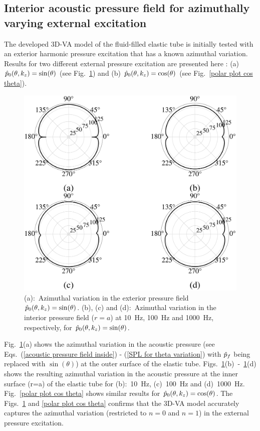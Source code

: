 \documentclass[11pt,cleanfoot]{asme2ej}
\begin{document}
\subsection{Interior acoustic pressure field for azimuthally varying external excitation}
\label{azimuthal excitation}
The developed 3D-VA model of the fluid-filled elastic tube is initially tested with an exterior harmonic pressure excitation that has a known azimuthal variation. Results for two different external pressure excitation are presented here : (a) $\Hat{p}_0(\theta,k_z) = \sin(\theta)$ (see Fig.~\ref{polar plot sin theta}) and (b) $\Hat{p}_0(\theta,k_z) = \cos(\theta)$ (see Fig.~\ref{polar plot cos theta}).


\begin{figure}[ht]
    \centerline{
    \includegraphics[width=4.5in]{polarplot_sin_theta.eps}}
    \caption{(a):~Azimuthal variation in the exterior pressure field $\Hat{p}_0(\theta,k_z) =\sin(\theta)$. (b), (c) and (d):~Azimuthal variation in the interior pressure field ($r=a$) at 10~Hz, 100~Hz and 1000~Hz, respectively, for $\Hat{p}_0(\theta,k_z) =\sin(\theta)$.}
    \label{polar plot sin theta}
\end{figure}

Fig.~\ref{polar plot sin theta}(a) shows the azimuthal variation in the acoustic pressure (see Eqs.~(\ref{acoustic pressure field inside}) - (\ref{SPL for theta variation}) with $\Hat{p}_f$ being replaced with $\sin(\theta)$) at the outer surface of the elastic tube. Figs.~\ref{polar plot sin theta}(b)~-~\ref{polar plot sin theta}(d) shows the resulting azimuthal variation in the acoustic pressure at the inner surface (r=a) of the elastic tube for (b):~10~Hz, (c)~100~Hz and (d)~1000~Hz. Fig.~\ref{polar plot cos theta} shows similar results for $\Hat{p}_0(\theta,k_z) = \cos(\theta)$. The Figs.~\ref{polar plot sin theta} and \ref{polar plot cos theta}
confirms that the 3D-VA model accurately captures the azimuthal variation (restricted to $n=0$ and $n=1$) in the external pressure excitation.
\end{document}
